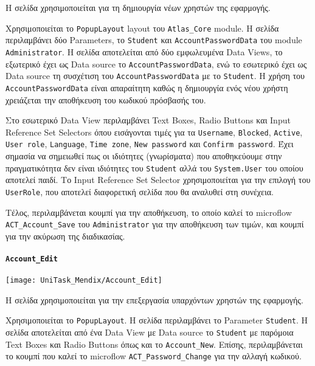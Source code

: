                     Η σελίδα χρησιμοποιείται για τη δημιουργία νέων χρηστών της εφαρμογής.

                    Χρησιμοποιείται το \texttt{PopupLayout} layout του \texttt{Atlas\_Core} module. Η σελίδα περιλαμβάνει δύο Parameters, το \texttt{Student} και \texttt{AccountPasswordData} του module \texttt{Administrator}. Η σελίδα αποτελείται από δύο εμφωλευμένα Data Views, το εξωτερικό έχει ως Data source το \texttt{AccountPasswordData}, ενώ το εσωτερικό έχει ως Data source τη συσχέτιση του \texttt{AccountPasswordData} με το \texttt{Student}. Η χρήση του \texttt{AccountPasswordData} είναι απαραίτητη καθώς η δημιουργία ενός νέου χρήστη χρειάζεται την αποθήκευση του κωδικού πρόσβασής του.

                    Στο εσωτερικό Data View περιλαμβάνει Text Boxes, Radio Buttons και Input \linebreak Reference Set Selectors όπου εισάγονται τιμές για τα \texttt{Username}, \texttt{Blocked}, \texttt{Active}, \texttt{User role}, \texttt{Language}, \texttt{Time zone}, \texttt{New password} και \texttt{Confirm password}. Έχει σημασία να σημειωθεί πως οι ιδιότητες (γνωρίσματα) που αποθηκεύουμε στην πραγματικότητα δεν είναι ιδιότητες του \texttt{Student} αλλά του \texttt{System.User} του οποίου αποτελεί παιδί. Το Input Reference Set Selector χρησιμοποιείται για την επιλογή του \texttt{UserRole}, που αποτελεί διαφορετική σελίδα που θα αναλυθεί στη συνέχεια.

                    Τέλος, περιλαμβάνεται κουμπί για την αποθήκευση, το οποίο καλεί το microflow \texttt{ACT\_Account\_Save} του \texttt{Administrator} για την αποθήκευση των τιμών, και κουμπί για την ακύρωση της διαδικασίας.

                \paragraph{\texttt{Account\_Edit}}
                    \begin{center}
                        \texttt{[image: UniTask\_Mendix/Account\_Edit]}
                    \end{center}

                    Η σελίδα χρησιμοποιείται για την επεξεργασία υπαρχόντων χρηστών της εφαρμογής.

                    Χρησιμοποιείται το \texttt{PopupLayout}. Η σελίδα περιλαμβάνει το Parameter \texttt{Student}. Η σελίδα αποτελείται από ένα Data View με Data source το \texttt{Student} με παρόμοια Text Boxes και Radio Buttons όπως και το \texttt{Account\_New}. Επίσης, περιλαμβάνεται το κουμπί που καλεί το microflow \texttt{ACT\_Password\_Change} για την αλλαγή κωδικού.

